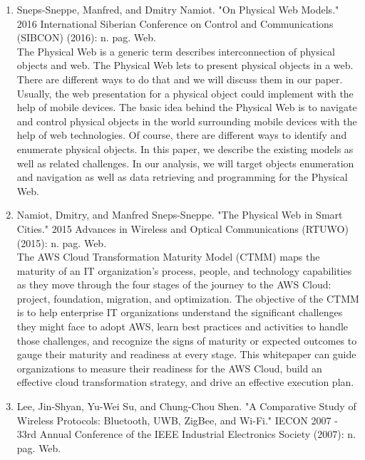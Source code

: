 \documentclass[oneside,a4paper,12pt]{report}
\begin{document}
\begin{enumerate}
\item Sneps-Sneppe, Manfred, and Dmitry Namiot. "On Physical Web Models." 2016 International Siberian Conference on Control and Communications (SIBCON) (2016): n. pag. Web.\\
The Physical Web is a generic term describes interconnection of physical objects and web. The Physical Web lets to present physical objects in a web. There are different ways
to do that and we will discuss them in our paper. Usually, the web presentation for a physical object could implement with the help of mobile devices. The basic idea behind the Physical Web is to navigate and control physical objects in the world surrounding
mobile devices with the help of web technologies. Of course, there are different ways to identify and enumerate physical objects. In this paper, we describe the existing models as well as related challenges. In our analysis, we will target objects enumeration
and navigation as well as data retrieving and programming for the Physical Web. \\
\item Namiot, Dmitry, and Manfred Sneps-Sneppe. "The Physical Web in Smart Cities." 2015 Advances in Wireless and Optical Communications (RTUWO) (2015): n. pag. Web.\\
The AWS Cloud Transformation Maturity Model (CTMM) maps the maturity of
an IT organization’s process, people, and technology capabilities as they move
through the four stages of the journey to the AWS Cloud: project, foundation,
migration, and optimization. The objective of the CTMM is to help enterprise IT
organizations understand the significant challenges they might face to adopt
AWS, learn best practices and activities to handle those challenges, and recognize
the signs of maturity or expected outcomes to gauge their maturity and readiness
at every stage. This whitepaper can guide organizations to measure their
readiness for the AWS Cloud, build an effective cloud transformation strategy,
and drive an effective execution plan.\\
\item Lee, Jin-Shyan, Yu-Wei Su, and Chung-Chou Shen. "A Comparative Study of Wireless Protocols: Bluetooth, UWB, ZigBee, and Wi-Fi." IECON 2007 - 33rd Annual Conference of the IEEE Industrial Electronics Society (2007): n. pag. Web.\\

\end{enumerate}
\end{document}

